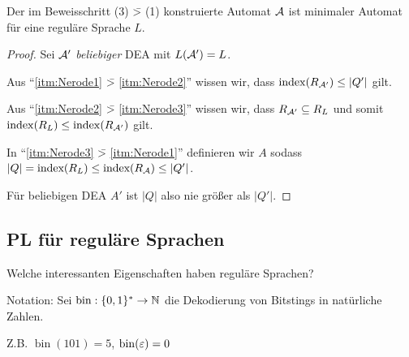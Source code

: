 %
\setcounter{Korollar}{4}
\begin{Korollar}\label{kor:2.minAutomat}
        Der im Beweisschritt (3) \=> (1) konstruierte Automat $\mathcal{A}$ ist minimaler Automat für eine reguläre Sprache $L$.
\end{Korollar}
\begin{proof}
        Sei $\mathcal{A}'$ \emph{beliebiger} \ac{DEA} mit $L(\mathcal{A}')=L$.
        
        Aus ``\ref{itm:Nerode1} {\=>} \ref{itm:Nerode2}'' wissen wir, dass $\operatorname{index}(R_{\mathcal{A}'})\leq |Q'|$ gilt.
        
        Aus ``\ref{itm:Nerode2} \=> \ref{itm:Nerode3}'' wissen wir, dass $R_{\mathcal{A}'}\subseteq R_L$ und somit $\operatorname{index}(R_L) \leq \operatorname{index}(R_{\mathcal{A}'})$ gilt.
        
        In ``\ref{itm:Nerode3} \=> \ref{itm:Nerode1}'' definieren wir $A$ sodass $|Q|=\text{index}(R_L) \leq \text{index}(R_{\mathcal{A}})\leq |Q'|$.
        
        Für beliebigen DEA $A'$ ist $|Q|$ also nie größer als $|Q'|$.
\end{proof}


\subsection{\acf{PL} für reguläre Sprachen} %
Welche interessanten Eigenschaften haben reguläre Sprachen?

Notation: Sei $\operatorname{bin}:\{0,1\}^*\rightarrow \mathbb{N}$ die Dekodierung von Bitstings in natürliche Zahlen.

Z.B. $\operatorname{bin}(101) = 5$, $\operatorname{bin}(\varepsilon) = 0$

